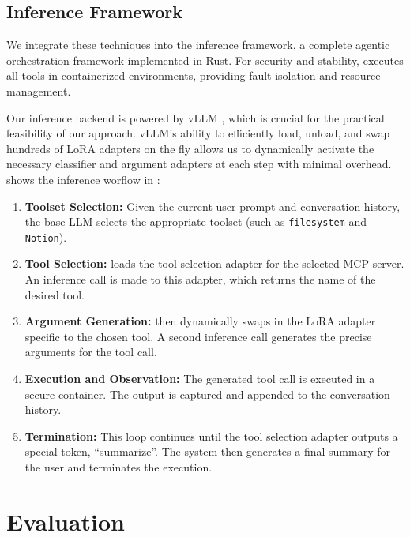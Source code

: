 

\subsection{Inference Framework}

We integrate these techniques into the \sys{} inference framework, a complete agentic orchestration framework implemented in Rust. For security and stability, \sys{} executes all tools in containerized environments, providing fault isolation and resource management.

Our inference backend is powered by vLLM \cite{kwon2023efficient}, which is crucial for the practical feasibility of our approach. vLLM's ability to efficiently load, unload, and swap hundreds of LoRA adapters on the fly allows us to dynamically activate the necessary classifier and argument adapters at each step with minimal overhead.  shows the inference worflow in \sys{}:

\begin{enumerate}
    \item \textbf{Toolset Selection:} Given the current user prompt and conversation history, the base LLM selects the appropriate toolset (such as \texttt{filesystem} and \texttt{Notion}).
    \item \textbf{Tool Selection:} \sys{} loads the tool selection adapter for the selected MCP server. An inference call is made to this adapter, which returns the name of the desired tool.
    \item \textbf{Argument Generation:} \sys{} then dynamically swaps in the LoRA adapter specific to the chosen tool. A second inference call generates the precise arguments for the tool call.
    \item \textbf{Execution and Observation:} The generated tool call is executed in a secure container. The output is captured and appended to the conversation history.
    \item \textbf{Termination:} This loop continues until the tool selection adapter outputs a special token, ``summarize''. The system then generates a final summary for the user and terminates the execution.
\end{enumerate}
\section{Evaluation}
\label{sec:evaluation}

